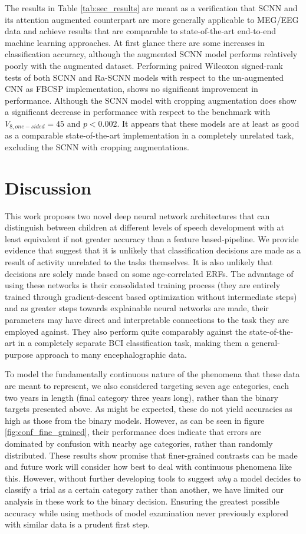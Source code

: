 \documentclass[fleqn,10pt]{wlscirep}
\begin{document}
The results in Table \ref{tab:sec_results} are meant as a verification that SCNN and its attention augmented counterpart are more generally applicable to MEG/EEG data and achieve results that are comparable to state-of-the-art end-to-end machine learning approaches. At first glance there are some increases in classification accuracy, although the augmented SCNN model performs relatively poorly with the augmented dataset. Performing paired Wilcoxon signed-rank tests of both SCNN and Ra-SCNN models with respect to the un-augmented CNN as FBCSP implementation, shows no significant improvement in performance. Although the SCNN model with cropping augmentation does show a significant decrease in performance with respect to the benchmark with $V_{8, one-sided}=45$ and $p<0.002$. It appears that these models are at least as good as a comparable state-of-the-art implementation in a completely unrelated task, excluding the SCNN with cropping augmentations.


\section*{Discussion}

This work proposes two novel deep neural network architectures that can distinguish between children at different levels of speech development with at least equivalent if not greater accuracy than a feature based-pipeline. We provide evidence that suggest that it is unlikely that classification decisions are made as a result of activity unrelated to the tasks themselves. It is also unlikely that decisions are solely made based on some age-correlated ERFs. The advantage of using these networks is their consolidated training process (they are entirely trained through gradient-descent based optimization without intermediate steps) and as greater steps towards explainable neural networks are made, their parameters may have direct and interpretable connections to the task they are employed against. They also perform quite comparably against the state-of-the-art in a completely separate BCI classification task, making them a general-purpose approach to many encephalographic data.

To model the fundamentally continuous nature of the phenomena that these data are meant to represent, we also considered targeting seven age categories, each two years in length (final category three years long), rather than the binary targets presented above. As might be expected, these do not yield accuracies as high as those from the binary models. However, as can be seen in figure \ref{fig:conf_fine_grained}, their performance does indicate that errors are dominated by confusion with nearby age categories, rather than randomly distributed. These results show promise that finer-grained contrasts can be made and future work will consider how best to deal with continuous phenomena like this. However, without further developing tools to suggest {\em why} a model decides to classify a trial as a certain category rather than another, we have limited our analysis in these work to the binary decision. Ensuring the greatest possible accuracy while using methods of model examination never previously explored with similar data is a prudent first step.
\end{document}

